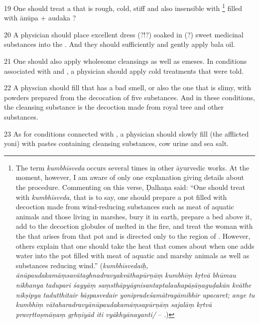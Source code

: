 \begin{translation}
\item [19]
One should treat a   that is rough, cold, stiff and also 
insensible with %
	\footnote{%
	The term \textit{kumbhīsveda} occurs several times in other āyurvedic works. 
	At the moment, however, I am aware of only one explanation giving details 
	about the procedure. 
	Commenting on this verse, Ḍalhaṇa said: 
		``One should treat with \textit{kumbhīsveda}, that is to say, one should 
		prepare a pot filled with decoction made from wind-reducing substances 
		such as meat of aquatic animals and those living in marshes, bury it in earth, 
		prepare a bed above it, add to the decoction globules of 
		 melted in the fire, and treat the woman 
		with the  that arises from that pot and is directed 
		only to the region of . However, others explain 
		that one should take the heat that comes about when one adds water into 
		the pot filled with meat of aquatic and marshy animals as well as substances 
		reducing wind.''
	 		(\textit{kumbhīsvedaiḥ, ānūpaudakamāṃsavātaghnadravyakvāthapūrṇāṃ 
	 		kumbhīṃ kṛtvā bhūmau nikhanya tadupari śayyāṃ 
	 		saṃsthāpyāgnisantaptalauhapāṣāṇaguḍakān kvāthe nikṣipya tadutthitair 
	 		bāṣpasvedair yonipradeśamātragāmibhir upacaret; anye tu kumbhīṃ 
	 		vātaharadravyānūpaudakamāṃsapūrṇāṃ sajalāṃ kṛtvā pravṛttoṣmāṇaṃ 
	 		gṛhṇīyād iti vyākhyānayanti/} -- .)
	} 
filled with ānūpa + audaka ? %

\item [20]
A physician should place excellent dress (?!?) soaked in (?) sweet medicinal substances into the . And they should sufficiently and gently apply bala oil.

\item [21]
One should also apply wholesome cleansings as well as emeses. 
In conditions associated with  and , a physician should apply cold treatments that were told.

\item [22]
A physcian should fill  that has a bad smell, or also the one that is slimy, with powders prepared from the decocation of five substances. And in these conditions, the cleansing substance is the decoction made from royal tree and other substances.

\item [23]
As for conditions connected with , a physician should slowly fill (the afflicted yoni) with pastes containing cleansing substances, cow urine and sea salt.  

\end{translation}
